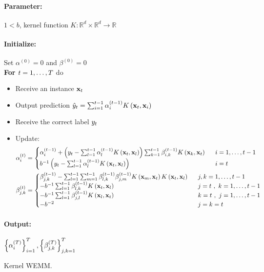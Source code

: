 \begin{figure}[t!]
{
\paragraph{Parameter:} $1<b$, kernel function $K:\mathbb{R}^{d}\times\mathbb{R}^{d}\rightarrow\mathbb{R}$
\paragraph{Initialize:} Set
$\alpha^{\left(0\right)}=0$ and $\beta^{\left(0\right)}=0$\\
{\bf For $t=1 , \ldots , T$} do
\begin{itemize}
\nolineskips
\item Receive an instance $\mathbf{x}_{t}$
\item Output  prediction $\hat{y}_{t}=\sum_{i=1}^{t-1}\alpha_{i}^{\left(t-1\right)}K\left(\mathbf{x}_{t},\mathbf{x}_{i}\right)$
\item Receive the correct label $y_{t}$
\item
Update:
\begin{align*}
\alpha_{i}^{\left(t\right)}&=\begin{cases}
\alpha_{i}^{\left(t-1\right)}+\left(y_{t}-\sum_{l=1}^{t-1}\alpha_{l}^{\left(t-1\right)}K\left(\mathbf{x}_{t},\mathbf{x}_{l}\right)\right)\sum_{k=1}^{t-1}\beta_{i,k}^{\left(t-1\right)}K\left(\mathbf{x}_{k},\mathbf{x}_{t}\right)
& ~~ i=1 , \ldots , t-1\\
b^{-1}\left(y_{t}-\sum_{l=1}^{t-1}\alpha_{l}^{\left(t-1\right)}K\left(\mathbf{x}_{t},\mathbf{x}_{l}\right)\right) & ~~ i=t
\end{cases}\\
\beta_{j,k}^{\left(t\right)}&=\begin{cases}
\beta_{j,k}^{\left(t-1\right)}-\sum_{l=1}^{t-1}\sum_{m=1}^{t-1}\beta_{l,k}^{\left(t-1\right)}\beta_{j,m}^{\left(t-1\right)}K\left(\mathbf{x}_{m},\mathbf{x}_{t}\right)K\left(\mathbf{x}_{t},\mathbf{x}_{l}\right)
& ~~ j,k=1 , \ldots , t-1\\
-b^{-1}\sum_{l=1}^{t-1}\beta_{l,k}^{\left(t-1\right)}K\left(\mathbf{x}_{t},\mathbf{x}_{l}\right)
& ~~ j=t~,~k=1 , \ldots , t-1\\
-b^{-1}\sum_{l=1}^{t-1}\beta_{j,l}^{\left(t-1\right)}K\left(\mathbf{x}_{l},\mathbf{x}_{t}\right)
& ~~ k=t~,~j=1 , \ldots , t-1\\
-b^{-2} & ~~ j=k=t
\end{cases}
\end{align*}
\end{itemize}
\paragraph{Output:}  $\left\{{\alpha_{i}^{\left(T\right)}}\right\}_{i=1}^T ,\left\{{\beta_{j,k}^{\left(T\right)}}\right\}_{j,k=1}^T$\\
}
\figline
\caption{Kernel WEMM.}
\label{algorithm:kernel_WEMM}
\end{figure}



